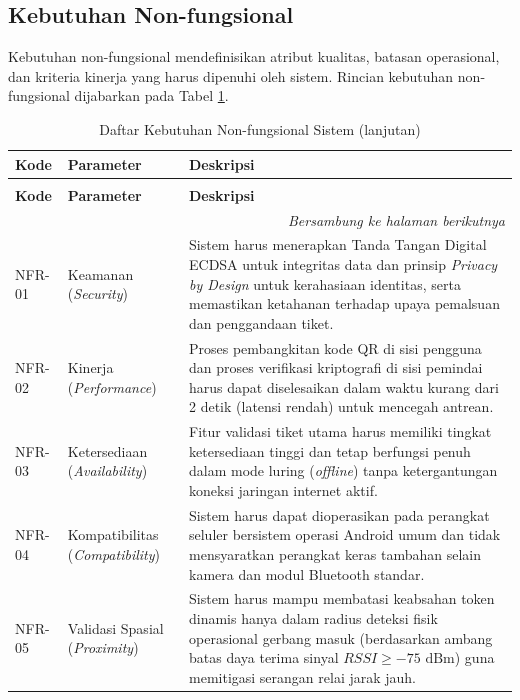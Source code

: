 \subsection{Kebutuhan Non-fungsional}
\label{subsec:kebutuhan_nonfungsional}
Kebutuhan non-fungsional mendefinisikan atribut kualitas, batasan operasional, dan kriteria kinerja yang harus dipenuhi oleh sistem. Rincian kebutuhan non-fungsional dijabarkan pada Tabel \ref{tab:non_functional_req}.

\begin{longtable}{|l|p{4.5cm}|p{7.5cm}|}
    \caption{Daftar Kebutuhan Non-fungsional Sistem}\label{tab:non_functional_req} \\
    \hline
    \textbf{Kode} & \textbf{Parameter} & \textbf{Deskripsi} \\
    \hline
    \endfirsthead
    
    \caption[]{Daftar Kebutuhan Non-fungsional Sistem (lanjutan)} \\
    \hline
    \textbf{Kode} & \textbf{Parameter} & \textbf{Deskripsi} \\
    \hline
    \endhead
    
    \hline
    \multicolumn{3}{r}{\textit{Bersambung ke halaman berikutnya}} \\
    \endfoot
    
    \hline
    \endlastfoot

    NFR-01 & Keamanan (\textit{Security}) & Sistem harus menerapkan Tanda Tangan Digital ECDSA untuk integritas data dan prinsip \textit{Privacy by Design} untuk kerahasiaan identitas, serta memastikan ketahanan terhadap upaya pemalsuan dan penggandaan tiket. \\
    \hline
    NFR-02 & Kinerja (\textit{Performance}) & Proses pembangkitan kode QR di sisi pengguna dan proses verifikasi kriptografi di sisi pemindai harus dapat diselesaikan dalam waktu kurang dari 2 detik (latensi rendah) untuk mencegah antrean. \\
    \hline
    NFR-03 & Ketersediaan (\textit{Availability}) & Fitur validasi tiket utama harus memiliki tingkat ketersediaan tinggi dan tetap berfungsi penuh dalam mode luring (\textit{offline}) tanpa ketergantungan koneksi jaringan internet aktif. \\
    \hline
    NFR-04 & Kompatibilitas (\textit{Compatibility}) & Sistem harus dapat dioperasikan pada perangkat seluler bersistem operasi Android umum dan tidak mensyaratkan perangkat keras tambahan selain kamera dan modul Bluetooth standar. \\
    \hline
    NFR-05 & Validasi Spasial (\textit{Proximity}) & Sistem harus mampu membatasi keabsahan token dinamis hanya dalam radius deteksi fisik operasional gerbang masuk (berdasarkan ambang batas daya terima sinyal $RSSI \ge -75\text{ dBm}$) guna memitigasi serangan relai jarak jauh. \\
    \hline
    
\end{longtable} 

